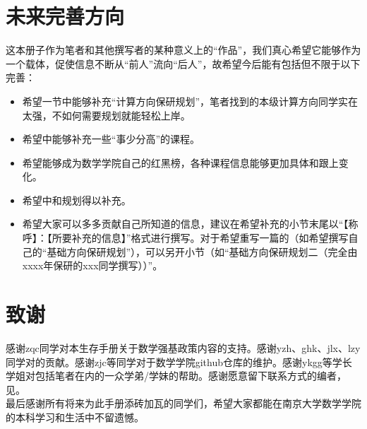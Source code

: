 \documentclass[a4paper,11pt,notitlepage]{article}
\begin{document}
\section{未来完善方向}
这本册子作为笔者和其他撰写者的某种意义上的“作品”，我们真心希望它能够作为一个载体，促使信息不断从“前人”流向“后人”，故希望今后能有包括但不限于以下完善：
\begin{itemize}
    \item 希望一节中能够补充“计算方向保研规划”，笔者找到的本级计算方向同学实在太强，不如何需要规划就能轻松上岸。
    \item 希望中能够补充一些“事少分高”的课程。
    \item 希望能够成为数学学院自己的红黑榜，各种课程信息能够更加具体和跟上变化。
    \item 希望中和规划得以补充。
    \item 希望大家可以多多贡献自己所知道的信息，建议在希望补充的小节末尾以“【称呼】：【所要补充的信息】”格式进行撰写。对于希望重写一篇的（如希望撰写自己的“基础方向保研规划”），可以另开小节（如“基础方向保研规划二（完全由xxxx年保研的xxx同学撰写））”。
\end{itemize}

\section{致谢}
感谢zqc同学对本生存手册关于数学强基政策内容的支持。感谢yzh、ghk、jlx、lzy同学对的贡献。感谢zjc等同学对于数学学院github仓库的维护。感谢ykgg等学长学姐对包括笔者在内的一众学弟/学妹的帮助。感谢愿意留下联系方式的编者，见。\\
\indent 最后感谢所有将来为此手册添砖加瓦的同学们，希望大家都能在南京大学数学学院的本科学习和生活中不留遗憾。


\printbibliography

\newpage
\end{document}
